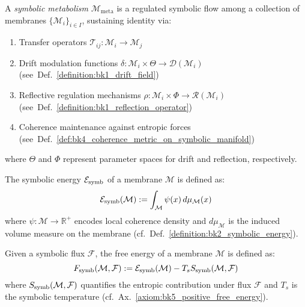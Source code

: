 \begin{definition}
\label{definition:bk5_symbolic_metabolism}
A \emph{symbolic metabolism} $\mathcal{M}_{\mathrm{meta}}$ is a regulated symbolic flow among a collection of membranes $\{\mathcal{M}_i\}_{i \in I}$, sustaining identity via:
\begin{enumerate}
  \item Transfer operators $\mathcal{T}_{ij}: \mathcal{M}_i \to \mathcal{M}_j$
  \item Drift modulation functions $\delta: \mathcal{M}_i \times \Theta \to \mathcal{D}(\mathcal{M}_i)$ (see~Def.~\ref{definition:bk1_drift_field})
  \item Reflective regulation mechanisms $\rho: \mathcal{M}_i \times \Phi \to \mathcal{R}(\mathcal{M}_i)$ (see~Def.~\ref{definition:bk1_reflection_operator})
  \item Coherence maintenance against entropic forces (see~Def.~\ref{def:bk4_coherence_metric_on_symbolic_manifold})
\end{enumerate}
\noindent where $\Theta$ and $\Phi$ represent parameter spaces for drift and reflection, respectively.
\end{definition}

\begin{definition}
\label{definition:bk5_symbolic_energy}
The symbolic energy $\mathcal{E}_{\mathrm{symb}}$ of a membrane $\mathcal{M}$ is defined as:
\begin{equation}
\mathcal{E}_{\mathrm{symb}}(\mathcal{M}) := \int_{\mathcal{M}} \psi(x) \, d\mu_{\mathcal{M}}(x)
\end{equation}
\noindent where $\psi: \mathcal{M} \to \mathbb{R}^+$ encodes local coherence density and $d\mu_{\mathcal{M}}$ is the induced volume measure on the membrane (cf.~Def.~\ref{definition:bk2_symbolic_energy}).
\end{definition}

\begin{definition}
\label{definition:bk5_symbolic_free_energy_und}
Given a symbolic flux $\mathcal{F}$, the free energy of a membrane $\mathcal{M}$ is defined as:
\begin{equation}
F_{\mathrm{symb}}(\mathcal{M}, \mathcal{F}) := \mathcal{E}_{\mathrm{symb}}(\mathcal{M}) - T_s S_{\mathrm{symb}}(\mathcal{M}, \mathcal{F})
\end{equation}
\noindent where $S_{\mathrm{symb}}(\mathcal{M}, \mathcal{F})$ quantifies the entropic contribution under flux $\mathcal{F}$ and $T_s$ is the symbolic temperature (cf.~Ax.~\ref{axiom:bk5_positive_free_energy}).
\end{definition}

